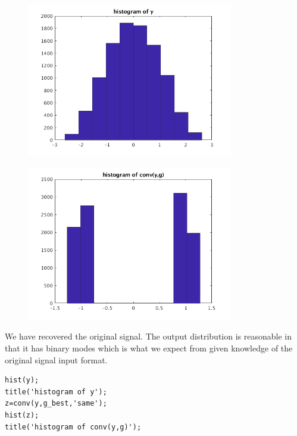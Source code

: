 \documentclass[12pt,letter]{article}
\begin{document}
\begin{enumerate}
\begin{itemize}
  \begin{figure}[H]
    \centering
    \includegraphics[width=9cm]{q10/part_b_hist_y.png}
  \end{figure}
  \begin{figure}[H]
    \centering
    \includegraphics[width=9cm]{q10/part_b_hist_z.png}
  \end{figure}
  We have recovered the original signal. The output distribution is reasonable in that it has binary modes which is what we expect from given knowledge of the original signal input format.

\begin{verbatim}
hist(y);
title('histogram of y');
z=conv(y,g_best,'same');
hist(z);
title('histogram of conv(y,g)');
\end{verbatim}
  \end{itemize}
  
\end{enumerate}
\end{document}
